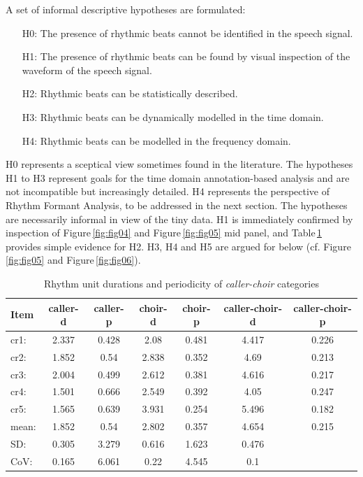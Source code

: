 \documentclass[output=paper,colorlinks,citecolor=brown
]{langscibook}
\begin{document}
A set of informal descriptive hypotheses are formulated:
\vspace{-10pt}
\begin{itemize} \itemsep -5pt
    \item[H0:] The presence of rhythmic beats cannot be identified in the speech signal.
    \item[H1:] The presence of rhythmic beats can be found by visual inspection of the waveform of the speech signal.
    \item[H2:] Rhythmic beats can be statistically described.
    \item[H3:] Rhythmic beats can be dynamically modelled in the time domain.
    \item[H4:] Rhythmic beats can be modelled in the frequency domain.
\end{itemize}
\vspace{-10pt}
H0 represents a sceptical view sometimes found in the literature. The hypotheses H1 to H3 represent goals for the time domain annotation-based analysis and are not incompatible but increasingly detailed. H4 represents the perspective of Rhythm Formant Analysis, to be addressed in the next section. The hypotheses are necessarily informal in view of the tiny data. H1 is immediately confirmed by inspection of Figure\,\ref{fig:fig04} and Figure\,\ref{fig:fig05} mid panel, and Table\,\ref{table:table01} provides simple evidence for H2. H3, H4 and H5 are argued for below (cf. Figure\,\ref{fig:fig05} and Figure\,\ref{fig:fig06}).
\begin{table}[ht]
\centering
\caption{Rhythm unit durations and periodicity of \textit{caller-choir} categories}
\vspace{0.2cm}
\label{table:table01}
\begin{tabular}{|l|c|c||c|c||c|c|}
\hline
\textbf{Item}	& \textbf{caller-d}	& \textbf{caller-p}	& \textbf{choir-d} & \textbf{choir-p} & \textbf{caller-choir-d} & \textbf{caller-choir-p}\\
\hline\hline
cr1:	& 2.337	& 0.428	& 2.08	& 0.481	& 4.417	& 0.226\\
\hline
cr2:	& 1.852	& 0.54	& 2.838	& 0.352	& 4.69	& 0.213\\
\hline
cr3:	& 2.004	& 0.499	& 2.612	& 0.381	& 4.616	& 0.217\\
\hline
cr4:	& 1.501	& 0.666	& 2.549	& 0.392	& 4.05	& 0.247\\
\hline
cr5:	& 1.565	& 0.639	& 3.931	& 0.254	& 5.496	& 0.182\\
\hline\hline
mean:	& 1.852	& 0.54	& 2.802	& 0.357	& 4.654	& 0.215\\
\hline
SD:	& 0.305	& 3.279	& 0.616	& 1.623	& 0.476	& \\
\hline
CoV:	& 0.165	& 6.061	& 0.22	& 4.545	& 0.1	& \\
\hline
\end{tabular}
\end{table}
\end{document}
